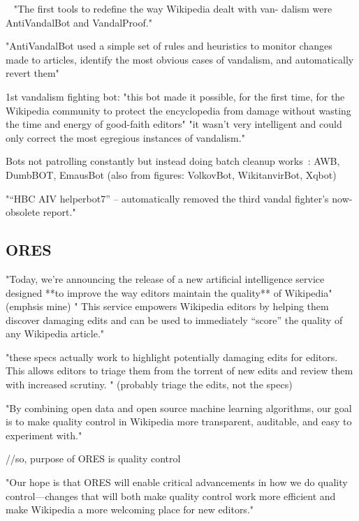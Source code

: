 ~\cite{HalRied2012}
"The first tools to redefine the
way Wikipedia dealt with van-
dalism were AntiVandalBot and
VandalProof."

"AntiVandalBot used a simple set
of rules and heuristics to monitor
changes made to articles, identify the
most obvious cases of vandalism, and
automatically revert them"

1st vandalism fighting bot:
"this bot made it possible, for the first
time, for the Wikipedia community
to protect the encyclopedia from
damage without wasting the time
and energy of good-faith editors"
"it
wasn’t very intelligent and could only
correct the most egregious instances
of vandalism."


Bots not patrolling constantly but instead doing batch cleanup works~\cite{GeiHal2013}:
AWB, DumbBOT, EmausBot
(also from figures: VolkovBot, WikitanvirBot, Xqbot)

\cite{GeiRib2010}
"“HBC AIV helperbot7” – automatically
removed the third vandal fighter's now-obsolete report."


\subsection{ORES}

\cite{HalTar2015}

"Today, we’re announcing the release of a new artificial intelligence service designed **to improve the way editors maintain the quality** of Wikipedia" (emphsis mine)
" This service empowers Wikipedia editors by helping them discover damaging edits and can be used to immediately “score” the quality of any Wikipedia article."

"these specs actually work to highlight potentially damaging edits for editors. This allows editors to triage them from the torrent of new edits and review them with increased scrutiny. " (probably triage the edits, not the specs)

"By combining open data and open source machine learning algorithms, our goal is to make quality control in Wikipedia more transparent, auditable, and easy to experiment with."

//so, purpose of ORES is quality control

"Our hope is that ORES will enable critical advancements in how we do quality control—changes that will both make quality control work more efficient and make Wikipedia a more welcoming place for new editors."


